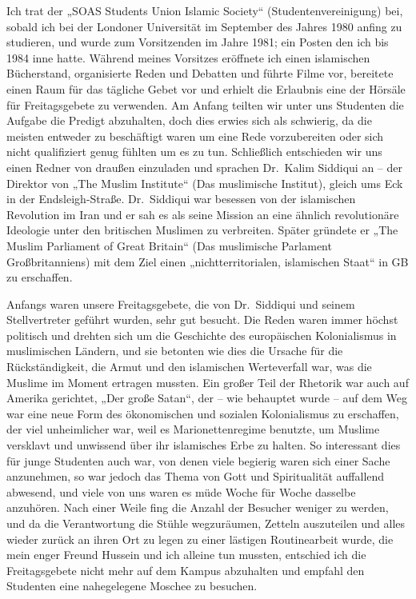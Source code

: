 \documentclass[12pt]{memoir}
\begin{document}
Ich trat der „SOAS Students Union Islamic Society“ (Studentenvereinigung) bei,
sobald ich bei der Londoner Universität
im September des Jahres 1980 anfing zu studieren,
und wurde zum Vorsitzenden im Jahre 1981;
ein Posten den ich bis 1984 inne hatte.
Während meines Vorsitzes eröffnete ich einen islamischen Bücherstand,
organisierte Reden und Debatten und führte Filme vor,
bereitete einen Raum für das tägliche Gebet vor
und erhielt die Erlaubnis eine der Hörsäle für Freitagsgebete zu verwenden.
Am Anfang teilten wir unter uns Studenten die Aufgabe die Predigt abzuhalten,
doch dies erwies sich als schwierig,
da die meisten entweder zu beschäftigt waren um eine Rede vorzubereiten
oder sich nicht qualifiziert genug fühlten um es zu tun.
Schließlich entschieden wir uns einen Redner von draußen einzuladen
und sprachen Dr.\ Kalim Siddiqui an –
der Direktor von „The Muslim Institute“ (Das muslimische Institut),
gleich ums Eck in der Endsleigh-Straße.
Dr.\ Siddiqui war besessen von der islamischen Revolution im Iran
und er sah es als seine Mission an eine ähnlich revolutionäre Ideologie
unter den britischen Muslimen zu verbreiten.
Später gründete er „The Muslim Parliament of Great Britain“
(Das muslimische Parlament Großbritanniens) mit dem Ziel
einen „nicht\–territorialen, islamischen Staat“ in GB zu erschaffen.

Anfangs waren unsere Freitagsgebete,
die von Dr.\ Siddiqui und seinem Stellvertreter geführt wurden,
sehr gut besucht.
Die Reden waren immer höchst politisch und drehten sich
um die Geschichte des europäischen Kolonialismus in muslimischen Ländern,
und sie betonten wie dies die Ursache für die Rückständigkeit,
die Armut und den islamischen Werteverfall war,
was die Muslime im Moment ertragen mussten.
Ein großer Teil der Rhetorik war auch auf Amerika gerichtet,
„Der große Satan“, der – wie behauptet wurde –
auf dem Weg war eine neue Form des ökonomischen
und sozialen Kolonialismus zu erschaffen, der viel unheimlicher war,
weil es Marionettenregime benutzte,
um Muslime versklavt und unwissend über ihr islamisches Erbe zu halten.
So interessant dies für junge Studenten auch war,
von denen viele begierig waren sich einer Sache anzunehmen,
so war jedoch das Thema von Gott und Spiritualität auffallend abwesend,
und viele von uns waren es müde Woche für Woche dasselbe anzuhören.
Nach einer Weile fing die Anzahl der Besucher weniger zu werden,
und da die Verantwortung die Stühle wegzuräumen,
Zetteln auszuteilen und alles wieder zurück an ihren Ort zu legen
zu einer lästigen Routinearbeit wurde,
die mein enger Freund Hussein und ich alleine tun mussten,
entschied ich die Freitagsgebete nicht mehr auf dem Kampus abzuhalten
und empfahl den Studenten eine nahegelegene Moschee zu besuchen.
\end{document}
